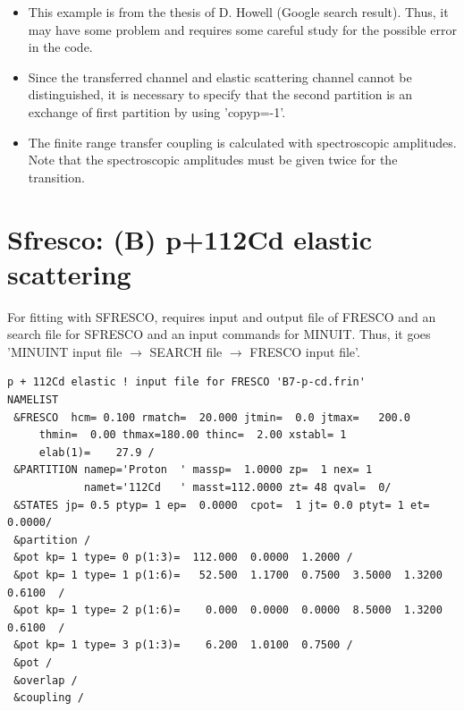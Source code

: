 \documentclass[11pt]{book}
\begin{document}
\begin{itemize}
\item This example is from the thesis of D. Howell (Google search result).
      Thus, it may have some problem and       
      requires some careful study for the possible error 
      in the code.
\item Since the transferred channel and elastic scattering channel
    cannot be distinguished, it is necessary to specify that 
    the second partition is an exchange of first partition by 
    using 'copyp=-1'.   
\item The finite range transfer coupling is calculated with spectroscopic
    amplitudes. 
    Note that the spectroscopic amplitudes must be given twice for the 
    transition.  

\end{itemize} 

\section{Sfresco: (B) p+112Cd elastic scattering}
For fitting with SFRESCO, requires input and output file of FRESCO and an search file for SFRESCO
and an input commands for MINUIT. 
Thus, it goes 'MINUINT input file $\to$ SEARCH file $\to$ FRESCO input file'. 



\begin{small} \begin{lstlisting}[frame=single]
p + 112Cd elastic ! input file for FRESCO 'B7-p-cd.frin'
NAMELIST
 &FRESCO  hcm= 0.100 rmatch=  20.000 jtmin=  0.0 jtmax=   200.0
     thmin=  0.00 thmax=180.00 thinc=  2.00 xstabl= 1 
     elab(1)=    27.9 /
 &PARTITION namep='Proton  ' massp=  1.0000 zp=  1 nex= 1 
            namet='112Cd   ' masst=112.0000 zt= 48 qval=  0/
 &STATES jp= 0.5 ptyp= 1 ep=  0.0000  cpot=  1 jt= 0.0 ptyt= 1 et=  0.0000/
 &partition /   
 &pot kp= 1 type= 0 p(1:3)=  112.000  0.0000  1.2000 /
 &pot kp= 1 type= 1 p(1:6)=   52.500  1.1700  0.7500  3.5000  1.3200  0.6100  /
 &pot kp= 1 type= 2 p(1:6)=    0.000  0.0000  0.0000  8.5000  1.3200  0.6100  /
 &pot kp= 1 type= 3 p(1:3)=    6.200  1.0100  0.7500 /
 &pot /   
 &overlap /   
 &coupling /
\end{lstlisting}\end{small}
\end{document}

